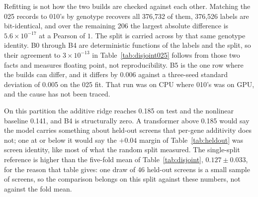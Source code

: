 
Refitting is not how the two builds are checked against each other. Matching the
025 records to 010's by genotype recovers all 376{,}732 of them, 376{,}526
labels are bit-identical, and over the remaining 206 the largest absolute
difference is $5.6 \times 10^{-17}$ at a Pearson of $1$. The split is carried
across by that same genotype identity. B0 through B4 are deterministic functions
of the labels and the split, so their agreement to $3 \times 10^{-13}$ in
Table~\ref{tab:disjoint025} follows from those two facts and measures floating
point, not reproducibility. B5 is the one row where the builds can differ, and
it differs by 0.006 against a three-seed standard deviation of 0.005 on the 025
fit. That run was on CPU where 010's was on GPU, and the cause has not been
traced.

On this partition the additive ridge reaches 0.185 on test and the nonlinear
baseline 0.141, and B4 is structurally zero. A transformer above 0.185 would say
the model carries something about held-out screens that per-gene additivity does
not; one at or below it would say the $+0.04$ margin of Table~\ref{tab:heldout}
was screen identity, like most of what the random split measured. The
single-split reference is higher than the five-fold mean of
Table~\ref{tab:disjoint}, $0.127 \pm 0.033$, for the reason that table gives:
one draw of 46 held-out screens is a small sample of screens, so the comparison
belongs on this split against these numbers, not against the fold mean.

